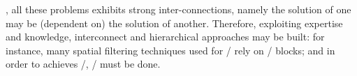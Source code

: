 


, all these problems exhibits strong inter-connections,
namely the solution of one may be (dependent on) the solution of another.
Therefore, exploiting expertise and knowledge,
interconnect and hierarchical approaches may be built:
for instance, many spatial filtering techniques used for \SE/ rely on \SSL/ blocks;
and in order to achieves \RooGE/, \AER/ must be done.

